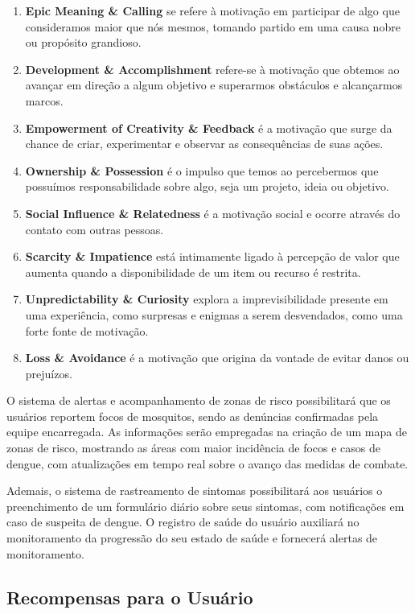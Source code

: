 \documentclass[a5paper, 12pt]{article}
\begin{document}
\begin{enumerate}
    \item \textbf{Epic Meaning \& Calling} se refere à motivação em participar de algo que consideramos maior que nós mesmos, tomando partido em uma causa nobre ou propósito grandioso.
    \item \textbf{Development \& Accomplishment} refere-se à motivação que obtemos ao avançar em direção a algum objetivo e superarmos obstáculos e alcançarmos marcos.
    \item \textbf{Empowerment of Creativity \& Feedback} é a motivação que surge da chance de criar, experimentar e observar as consequências de suas ações.
    \item \textbf{Ownership \& Possession} é o impulso que temos ao percebermos que possuímos responsabilidade sobre algo, seja um projeto, ideia ou objetivo.
    \item \textbf{Social Influence \& Relatedness} é a motivação social e ocorre através do contato com outras pessoas.
    \item \textbf{Scarcity \& Impatience} está intimamente ligado à percepção de valor que aumenta quando a disponibilidade de um item ou recurso é restrita.
    \item \textbf{Unpredictability \& Curiosity} explora a imprevisibilidade presente em uma experiência, como surpresas e enigmas a serem desvendados, como uma forte fonte de motivação.
    \item \textbf{Loss \& Avoidance} é a motivação que origina da vontade de evitar danos ou prejuízos.
\end{enumerate}

O sistema de alertas e acompanhamento de zonas de risco possibilitará que os usuários reportem focos de mosquitos, sendo as denúncias confirmadas pela equipe encarregada. As informações serão empregadas na criação de um mapa de zonas de risco, mostrando as áreas com maior incidência de focos e casos de dengue, com atualizações em tempo real sobre o avanço das medidas de combate.

Ademais, o sistema de rastreamento de sintomas possibilitará aos usuários o preenchimento de um formulário diário sobre seus sintomas, com notificações em caso de suspeita de dengue. O registro de saúde do usuário auxiliará no monitoramento da progressão do seu estado de saúde e fornecerá alertas de monitoramento.

\subsection{Recompensas para o Usuário}
\end{document}
